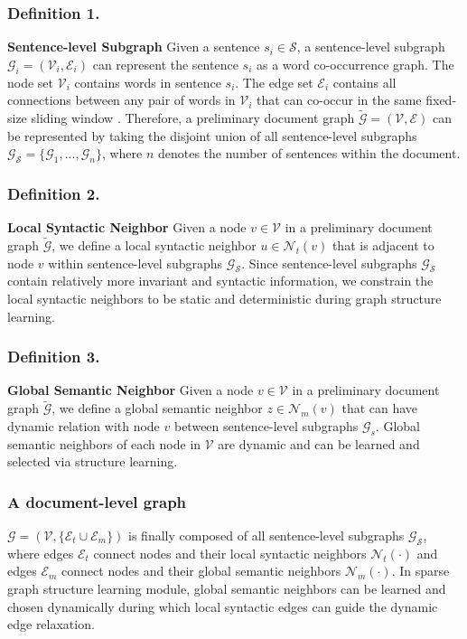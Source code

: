 \documentclass[letterpaper]{article} %
\begin{document}
\subsubsection{Definition 1.}\textbf{Sentence-level Subgraph} Given a sentence \(s_i \in \mathcal{S} \), a sentence-level subgraph \( \mathcal{G}_i = (\mathcal{V}_i, \mathcal{E}_i)\) can represent the sentence $s_i$ as a word co-occurrence graph. 
The node set \(\mathcal{V}_i\) contains words in sentence $s_i$. The edge set \(\mathcal{E}_i\) contains all connections between any pair of words in \(\mathcal{V}_i\) that can co-occur in the same fixed-size sliding window \cite{mihalcea2004textrank}. Therefore, a preliminary document graph \(\tilde{\mathcal{G}}=(\mathcal{V}, \mathcal{E})\) can be represented by taking the disjoint union of all sentence-level subgraphs \( \mathcal{G}_\mathcal{S}=\{ {\mathcal{G}_1,..., \mathcal{G}_n } \}\), where $n$ denotes the number of sentences within the document.

\subsubsection{Definition 2.}\textbf{Local Syntactic Neighbor} Given a node \(v \in \mathcal{V}\) in a preliminary document graph \(\tilde{\mathcal{G}}\), we define a local syntactic neighbor \(u \in \mathcal{N}_t(v)\) that is adjacent to node \(v\) within sentence-level subgraphs \(\mathcal{G}_\mathcal{S}\). Since sentence-level subgraphs \(\mathcal{G}_\mathcal{S}\) contain relatively more invariant and syntactic information, we constrain the local syntactic neighbors to be static and deterministic during graph structure learning.
\subsubsection{Definition 3.}\textbf{Global Semantic Neighbor} Given a node \(v \in \mathcal{V}\) in a preliminary document graph \(\tilde{\mathcal{G}}\), we define a global semantic neighbor \(z \in \mathcal{N}_m(v)\) that can have dynamic relation with node \(v\) between sentence-level subgraphs \(\mathcal{G}_s\). Global semantic neighbors of each node in \(\mathcal{V}\) are dynamic and can be learned and selected via structure learning. 
\subsubsection{A document-level graph} \(\mathcal{G}=(\mathcal{V},  \{\mathcal{E}_t\cup{\mathcal{E}_m\}})\) is finally composed of all sentence-level subgraphs \(\mathcal{G}_{\mathcal{S}}\), where edges \(\mathcal{E}_t\) connect nodes and their local syntactic neighbors \(\mathcal{N}_t(\cdot)\) and edges \(\mathcal{E}_m\) connect nodes and their global semantic neighbors \(\mathcal{N}_m(\cdot)\). In sparse graph structure learning module, global semantic neighbors can be learned and chosen dynamically during which local syntactic edges can guide the dynamic edge relaxation. 
\end{document}
